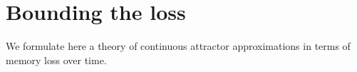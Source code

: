 \documentclass{article} %
\newcounter{ct}
\theoremstyle{definition}
\theoremstyle{remark}
\begin{document}
%
%
%
%
%
%




\newpage

\section{Bounding the loss}\label{sec:app:bouding}
We formulate here a theory of continuous attractor approximations in terms of memory loss over time.
\end{document}
